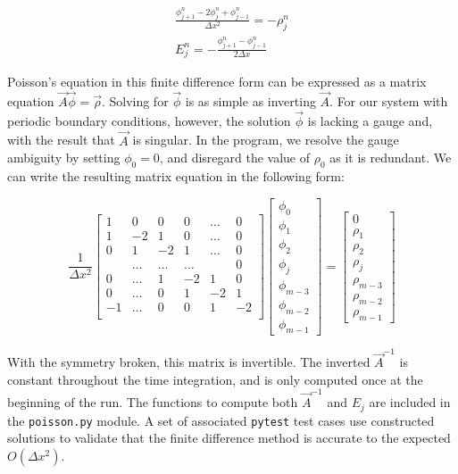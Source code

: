 \documentclass[%
 reprint,
 amsmath,amssymb,
 aps,
]{revtex4-2}
\begin{document}
\begin{eqnarray}
\frac{\phi^n _{j+1} - 2 \phi_j ^n + \phi^n_{j-1}}{\Delta x ^2} = - \rho _j ^n \\
E_j ^n = - \frac{\phi ^n _{j+1} - \phi ^n _{j-1}}{2 \Delta x}
\end{eqnarray}

Poisson's equation in this finite difference form can be expressed as a matrix equation $\vec A \vec \phi = \vec \rho $. Solving for $\vec \phi$ is as simple as inverting $\vec A$. For our system with periodic boundary conditions, however, the solution $\vec \phi$ is lacking a gauge and, with the result that $\vec A$ is singular. In the program, we resolve the gauge ambiguity by setting $\phi_0 = 0$, and disregard the value of $\rho_0$ as it is redundant. We can write the resulting matrix equation in the following form:

\begin{equation}
\frac{1}{\Delta x ^2}\begin{bmatrix}
1 & 0 & 0 & 0 & \ldots & 0 \\
1 & -2 & 1 & 0 & \ldots & 0 \\
0 & 1 & -2 & 1 & \ldots & 0 \\
 & \ldots & \ldots & \ldots &  & 0 \\
0 & \ldots & 1 & -2 & 1 & 0 \\
0 & \ldots & 0 & 1 & -2 & 1 \\
-1 & \ldots & 0 & 0 & 1 & -2 \\
\end{bmatrix} \begin{bmatrix}
\phi_0 \\ \phi_1 \\ \phi_2 \\ \phi_j \\ \phi_{m-3} \\ \phi_{m-2} \\ \phi_{m-1} 
\end{bmatrix} = \begin{bmatrix}
0 \\ \rho_1 \\ \rho_2 \\ \rho_j \\ \rho_{m-3} \\ \rho_{m-2} \\ \rho_{m-1} 
\end{bmatrix}
\end{equation}

With the symmetry broken, this matrix is invertible. The inverted $\vec A^{-1}$ is constant throughout the time integration, and is only computed once at the beginning of the run. The functions to compute both $\vec A^{-1}$ and $E_j$ are included in the \texttt{poisson.py} module. A set of associated \texttt{pytest} test cases use constructed solutions to validate that the finite difference method is accurate to the expected $O(\Delta x ^2)$.
\end{document}

